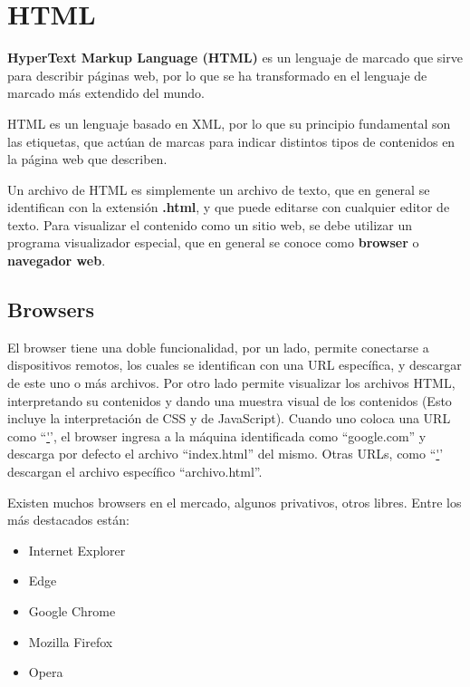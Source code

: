 
\chapter{HTML}
\label{HTML}

\textbf{HyperText Markup Language (HTML)} es un lenguaje de marcado que sirve
para describir páginas web, por lo que se ha transformado en el lenguaje de
marcado más extendido del mundo.

HTML es un lenguaje basado en XML, por lo que su principio fundamental son las
etiquetas, que actúan de marcas para indicar distintos tipos de contenidos en la
página web que describen.

Un archivo de HTML es simplemente un archivo de texto, que en general se identifican
con la extensión \textbf{.html}, y que puede editarse con cualquier editor de
texto. Para visualizar el contenido como un sitio web, se debe utilizar un
programa visualizador especial, que en general se conoce como \textbf{browser} o
\textbf{navegador web}.

\section{Browsers}

El browser tiene una doble funcionalidad, por un lado, permite conectarse a
dispositivos remotos, los cuales se identifican con una URL específica, y descargar
de este uno o más archivos. Por otro lado permite visualizar los archivos HTML,
interpretando su contenidos y dando una muestra visual de los contenidos (Esto
incluye la interpretación de CSS y de JavaScript). Cuando uno coloca una URL
como ``\href{http://google.com}'', el browser ingresa a la máquina identificada
como ``google.com'' y descarga por defecto el archivo ``index.html'' del mismo.
Otras URLs, como ``\href{http://google.com/archivo.html}'' descargan el archivo
específico ``archivo.html''.

Existen muchos browsers en el mercado, algunos privativos, otros libres. Entre
los más destacados están:
\begin{itemize}
    \item Internet Explorer
    \item Edge
    \item Google Chrome
    \item Mozilla Firefox
    \item Opera
\end{itemize}

